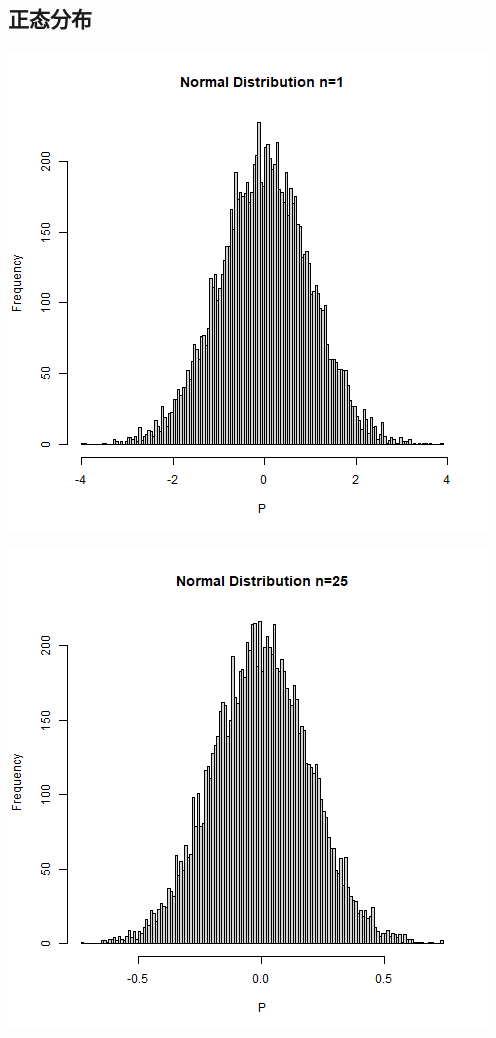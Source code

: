 \documentclass{article}
\begin{document}
\begin{CJK}{UTF8}{gbsn}
\subsection{正态分布}
\begin{minipage}{0.5\textwidth}
    \includegraphics[scale=0.6]{hist1-1.png}
\end{minipage}
\begin{minipage}{0.5\textwidth}
    \includegraphics[scale=0.6]{hist1-2.png}

\end{minipage}
\end{CJK}
\end{document}
